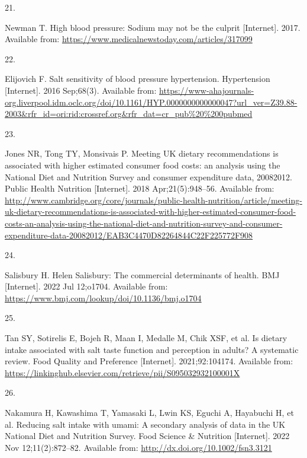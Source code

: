 \documentclass[
]{article}
\newlength{\cslhangindent}
\newlength{\csllabelwidth}
\newlength{\cslentryspacingunit} %
\newenvironment{CSLReferences}[2] %
 {%
  \setlength{\parindent}{0pt}
  \ifodd #1
  \let\oldpar\par
  \def\par{\hangindent=\cslhangindent\oldpar}
  \fi
  \setlength{\parskip}{#2\cslentryspacingunit}
 }%
 {}
\newcommand{\CSLLeftMargin}[1]{\parbox[t]{\csllabelwidth}{#1}}
\newcommand{\CSLRightInline}[1]{\parbox[t]{\linewidth - \csllabelwidth}{#1}\break}
\begin{document}
\begin{CSLReferences}{0}{0}
\leavevmode{}%
\CSLLeftMargin{21. }%
\CSLRightInline{Newman T. High blood pressure: Sodium may not be the
culprit {[}Internet{]}. 2017. Available from:
\url{https://www.medicalnewstoday.com/articles/317099}}

\leavevmode{}%
\CSLLeftMargin{22. }%
\CSLRightInline{Elijovich F. Salt sensitivity of blood pressure
\textbar{} hypertension. Hypertension {[}Internet{]}. 2016 Sep;68(3).
Available from:
\url{https://www-ahajournals-org.liverpool.idm.oclc.org/doi/10.1161/HYP.0000000000000047?url_ver=Z39.88-2003\&rfr_id=ori:rid:crossref.org\&rfr_dat=cr_pub\%20\%200pubmed}}

\leavevmode{}%
\CSLLeftMargin{23. }%
\CSLRightInline{Jones NR, Tong TY, Monsivais P. Meeting UK dietary
recommendations is associated with higher estimated consumer food costs:
an analysis using the National Diet and Nutrition Survey and consumer
expenditure data, 2008{\textendash}2012. Public Health Nutrition
{[}Internet{]}. 2018 Apr;21(5):948--56. Available from:
\url{http://www.cambridge.org/core/journals/public-health-nutrition/article/meeting-uk-dietary-recommendations-is-associated-with-higher-estimated-consumer-food-costs-an-analysis-using-the-national-diet-and-nutrition-survey-and-consumer-expenditure-data-20082012/EAB3C4470D82264844C22F225772F908}}

\leavevmode{}%
\CSLLeftMargin{24. }%
\CSLRightInline{Salisbury H. Helen Salisbury: The commercial
determinants of health. BMJ {[}Internet{]}. 2022 Jul 12;o1704. Available
from: \url{https://www.bmj.com/lookup/doi/10.1136/bmj.o1704}}

\leavevmode{}%
\CSLLeftMargin{25. }%
\CSLRightInline{Tan SY, Sotirelis E, Bojeh R, Maan I, Medalle M, Chik
XSF, et al. Is dietary intake associated with salt taste function and
perception in adults? A systematic review. Food Quality and Preference
{[}Internet{]}. 2021;92:104174. Available from:
\url{https://linkinghub.elsevier.com/retrieve/pii/S095032932100001X}}

\leavevmode{}%
\CSLLeftMargin{26. }%
\CSLRightInline{Nakamura H, Kawashima T, Yamasaki L, Lwin KS, Eguchi A,
Hayabuchi H, et al. Reducing salt intake with umami: A secondary
analysis of data in the UK National Diet and Nutrition Survey. Food
Science \& Nutrition {[}Internet{]}. 2022 Nov 12;11(2):872--82.
Available from: \url{http://dx.doi.org/10.1002/fsn3.3121}}


\end{CSLReferences}
\end{document}
